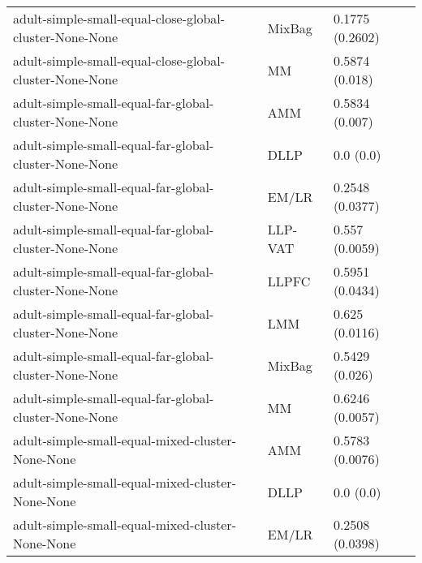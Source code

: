 \begin{longtable}{lll}
                                                      adult-simple-small-equal-close-global-cluster-None-None &    MixBag &                       0.1775 (0.2602) \\
                                                      adult-simple-small-equal-close-global-cluster-None-None &        MM &                        0.5874 (0.018) \\
                                                        adult-simple-small-equal-far-global-cluster-None-None &       AMM &                        0.5834 (0.007) \\
                                                        adult-simple-small-equal-far-global-cluster-None-None &      DLLP &                             0.0 (0.0) \\
                                                        adult-simple-small-equal-far-global-cluster-None-None &     EM/LR &                       0.2548 (0.0377) \\
                                                        adult-simple-small-equal-far-global-cluster-None-None &   LLP-VAT &                        0.557 (0.0059) \\
                                                        adult-simple-small-equal-far-global-cluster-None-None &     LLPFC &                       0.5951 (0.0434) \\
                                                        adult-simple-small-equal-far-global-cluster-None-None &       LMM &                        0.625 (0.0116) \\
                                                        adult-simple-small-equal-far-global-cluster-None-None &    MixBag &                        0.5429 (0.026) \\
                                                        adult-simple-small-equal-far-global-cluster-None-None &        MM &                       0.6246 (0.0057) \\
                                                             adult-simple-small-equal-mixed-cluster-None-None &       AMM &                       0.5783 (0.0076) \\
                                                             adult-simple-small-equal-mixed-cluster-None-None &      DLLP &                             0.0 (0.0) \\
                                                             adult-simple-small-equal-mixed-cluster-None-None &     EM/LR &                       0.2508 (0.0398) \\

\end{longtable}

